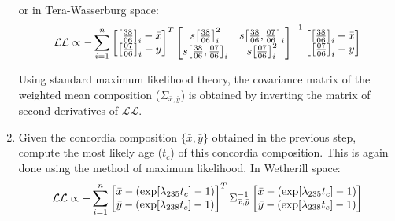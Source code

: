 \begin{refsection}
\begin{enumerate}
    or in Tera-Wasserburg space:
        \[
    \mathcal{LL} \propto
    - \sum\limits_{i=1}^{n}
    \left[
      \begin{array}{@{}c@{}}
        \left[\frac{38}{06}\right]_i-\bar{x}\\
        \left[\frac{07}{06}\right]_i-\bar{y}
      \end{array}
      \right]^T
    \left[
      \begin{array}{@{}cc@{}}
        s\!\left[\frac{38}{06}\right]_i^2 &
        s\!\left[\frac{38}{06},\frac{07}{06}\right]_i\\
        s\!\left[\frac{38}{06},\frac{07}{06}\right]_i &
        s\!\left[\frac{07}{06}\right]_i^2
      \end{array}
      \right]^{-1}
    \left[
      \begin{array}{@{}c@{}}
        \left[\frac{38}{06}\right]_i-\bar{x}\\
        \left[\frac{07}{06}\right]_i-\bar{y}
      \end{array}
      \right]    
    \]

    Using standard maximum likelihood theory, the covariance matrix of
    the weighted mean composition ($\Sigma_{\bar{x},\bar{y}}$) is
    obtained by inverting the matrix of second derivatives of
    $\mathcal{LL}$.
    
  \item Given the concordia composition $\{\bar{x},\bar{y}\}$ obtained
    in the previous step, compute the most likely age ($t_c$) of this
    concordia composition. This is again done using the method of
    maximum likelihood. In Wetherill space:
        \[
    \mathcal{LL} \propto
    - \sum\limits_{i=1}^{n}
    \left[
      \begin{array}{@{}c@{}}
        \bar{x} - (\exp[\lambda_{235}t_c] - 1)\\
        \bar{y} - (\exp[\lambda_{238}t_c] - 1)
      \end{array}
      \right]^T
    \Sigma_{\bar{x},\bar{y}}^{-1}
    \left[
      \begin{array}{@{}c@{}}
        \bar{x} - (\exp[\lambda_{235}t_c] - 1)\\
        \bar{y} - (\exp[\lambda_{238}t_c] - 1)
      \end{array}
      \right]
    \]


\end{enumerate}
\end{refsection}
